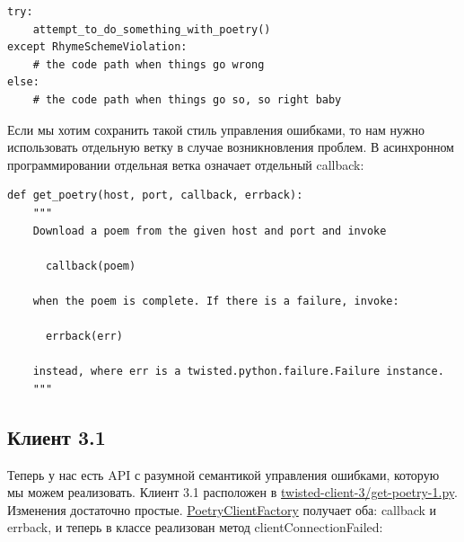 \begin{scriptsize}\begin{verbatim}
try:
    attempt_to_do_something_with_poetry()
except RhymeSchemeViolation:
    # the code path when things go wrong
else:
    # the code path when things go so, so right baby
\end{verbatim}\end{scriptsize}


Если мы хотим сохранить такой стиль управления ошибками, то нам 
нужно использовать отдельную ветку в случае возникновления проблем. 
В асинхронном программировании отдельная ветка означает отдельный 
callback: 

\begin{scriptsize}\begin{verbatim}
def get_poetry(host, port, callback, errback):
    """
    Download a poem from the given host and port and invoke

      callback(poem)

    when the poem is complete. If there is a failure, invoke:

      errback(err)

    instead, where err is a twisted.python.failure.Failure instance.
    """
\end{verbatim}\end{scriptsize}

\subsection{Клиент 3.1}


Теперь у нас есть API с разумной семантикой управления 
ошибками, которую мы можем реализовать. Клиент 3.1 расположен в
\href{http://github.com/jdavisp3/twisted-intro/blob/master/twisted-client-3/get-poetry-1.py}{twisted-client-3/get-poetry-1.py}. 
Изменения достаточно простые. 
\href{http://github.com/jdavisp3/twisted-intro/blob/master/twisted-client-3/get-poetry-1.py#L66}{PoetryClientFactory} 
получает оба: callback и errback, и теперь в классе реализован 
метод clientConnectionFailed:

